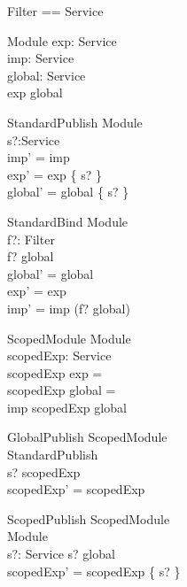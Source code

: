 \documentclass[a4paper]{article}
\begin{document}
\begin{zed}
Filter == \power Service
\end{zed}

\begin{schema}{Module}
exp: \power Service \\
imp: \power Service \\
global: \power Service \\
\where
exp \subseteq global
\end{schema}

\begin{schema}{StandardPublish}
\Delta Module \\
s?:Service \\
\where
imp' = imp \\
exp' = exp \cup \{ s? \} \\
global' = global \cup \{ s? \} 
\end{schema}

\begin{schema}{StandardBind}
\Delta Module \\
f?: Filter \\
\where
f? \cap global \neq \emptyset \\
global' = global \\
exp' = exp \\
imp' = imp \cup (f? \cap global) \\
\end{schema}

\begin{schema}{ScopedModule}
Module \\
scopedExp: \power Service \\
\where
scopedExp \cap exp = \emptyset \\
scopedExp \cap global = \emptyset \\
imp \subseteq scopedExp \cup global \\
\end{schema}

\begin{schema}{GlobalPublish}
\Delta ScopedModule \\
StandardPublish \\
\where
s? \notin scopedExp \\
scopedExp' = scopedExp \\
\end{schema}

\begin{schema}{ScopedPublish}
\Delta ScopedModule \\
\Xi Module \\
s?: Service
\where
s? \notin global \\
scopedExp' = scopedExp \cup \{ s? \} \\
\end{schema}
\end{document}
